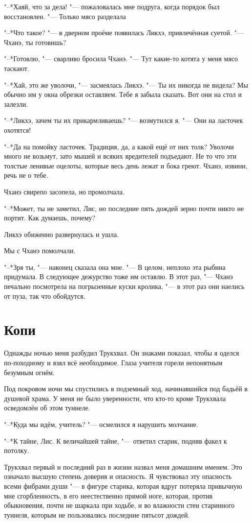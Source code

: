 \documentclass[a4paper,10pt,fleqn]{book}
\newcommand{\ldotst}{\so{...}\xspace}
\newcommand{\ldotse}{\so{!..}\xspace}
\begin{document}
"--*Хаяй, что за дела! "--- пожаловалась мне подруга, когда порядок был восстановлен.
"--- Только мясо разделала\ldotse

"--*Что такое? "--- в дверном проёме появилась Ликхэ, привлечённая суетой.
"--- Чханэ, ты готовишь?

"--*Готовлю, "--- сварливо бросила Чханэ.
"--- Тут какие-то котята у меня мясо таскают.

"--*Хай, это же уволочи, "--- засмеялась Ликхэ.
"--- Ты их никогда не видела?
Мы обычно им у окна обрезки оставляем.
Тебе я забыла сказать.
Вот они на стол и залезли.

"--*Ликхэ, зачем ты их прикармливаешь? "--- возмутился я.
"--- Они на ласточек охотятся!

"--*Да на помойку ласточек.
Традиция, да, а какой ещё от них толк?
Уволочи много не возьмут, зато мышей и всяких вредителей подъедают.
Не то что эти толстые ленивые оцелоты, которые весь день лежат и бока греют.
Чханэ, извини, речь не о тебе.

Чханэ свирепо засопела, но промолчала.

"--*Может, ты не заметил, Лис, но последние пять дождей зерно почти никто не портит.
Как думаешь, почему?

Ликхэ обиженно развернулась и ушла.

Мы с Чханэ помолчали.

"--*Зря ты, "--- наконец сказала она мне.
"--- В целом, неплохо эта рыбина придумала.
В следующее дежурство тоже им оставлю.
В этот раз, "--- Чханэ печально посмотрела на погрызенные куски кролика, "--- в этот раз они наелись от пуза, так что обойдутся.

\section{Копи}

Однажды ночью меня разбудил Трукхвал.
Он знаками показал, чтобы я оделся по-походному и взял всё необходимое.
Глаза учителя горели непонятным безумным огнём.

Под покровом ночи мы спустились в подземный ход, начинавшийся под бадьёй в душевой храма.
У меня не было уверенности, что кто-то кроме Трукхвала осведомлён об этом туннеле.

"--*Куда мы идём, учитель? "--- осмелился я нарушить молчание.

"--*К тайне, Лис.
К величайшей тайне, "--- ответил старик, подняв факел к потолку.

Трукхвал первый и последний раз в жизни назвал меня домашним именем.
Это означало высшую степень доверия\ldotst и опасность.
Я чувствовал эту опасность всеми фибрами души "--- в фигуре старика, которая вдруг потеряла привычную мне сгорбленность, в его неестественно прямой ноге, которая, против обыкновения, почти не шаркала при ходьбе, и во влажности стен старинного туннеля, которым не пользовались последние пятьсот дождей.
\end{document}
